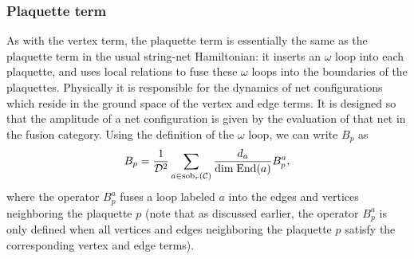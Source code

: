 \subsubsection{Plaquette term}

As with the vertex term, the plaquette term is essentially the same as the plaquette term in the usual string-net Hamiltonian: 
it inserts an $\omega$ loop 
into each plaquette, and uses local relations to fuse these $\omega$ loops into the boundaries of the plaquettes. 
Physically it is responsible for the dynamics of net configurations which reside in the ground space of the vertex and edge terms. 
It is designed so that the amplitude of a net configuration is given by the evaluation of that net in the fusion category.
Using the definition of the $\omega$ loop, we can write $B_p$ as 
\begin{align} \label{plaquette_term_defn}
B_p =\frac{1}{\mathcal{D}^2} \sum_{a \in \text{sob}_r(\mathcal{C})} \frac{d_a}{\text{dim} \; \text{End}(a)} B^a_p, 
\end{align}
where the operator $B_p^a$ fuses a loop labeled $a$ into the edges and vertices neighboring the plaquette $p$ (note that 
as discussed earlier, the operator $B_p^a$ is only defined when all vertices and edges neighboring the plaquette $p$ satisfy the corresponding vertex and edge terms).


